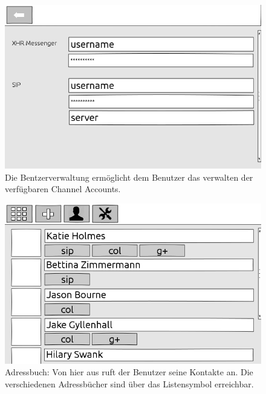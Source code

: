 		\begin{figure}[H]
		\centering
		\includegraphics[height=0.4\textheight]{../ui/img/uiDraft2/UserView-addChannel.png}
		\caption{Die Bentzerverwaltung ermöglicht dem Benutzer das verwalten der verfügbaren Channel Accounts.}
		\label{user management screen}
	\end{figure}
	\begin{figure}[H]
		\centering
		\includegraphics[height=0.4\textheight]{../ui/img/uiDraft2/ContactbookView.png}
		\caption{Adressbuch: Von hier aus ruft der Benutzer seine Kontakte an. Die verschiedenen Adressbücher sind über das Listensymbol erreichbar.}
		\label{contactbook screen}
	\end{figure}
